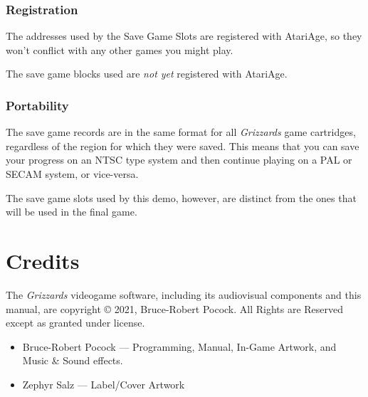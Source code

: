\documentclass[12pt,openright,book]{memoir}
\begin{document}
\begin{description}
\subsection{Registration}

\ifdefined\FIXMERegisterGameWithAtariAge

The addresses used by the Save  Game Slots are registered with AtariAge,
so they won't conflict with any other games you might play.

\else

The save game blocks used are \emph{not yet} registered with AtariAge.

\fi

\fi


\subsection{Portability}

The save game records are in the same format for all \textit{Grizzards} game
cartridges, regardless of the region for which they were saved.  This means
that you can save your progress on an NTSC type system and then continue
playing on a PAL or SECAM system, or vice-versa.

\ifdefined\DEMO

The save  game slots used by  this demo, however, are  distinct from the
ones that will be used in the final game.

\fi

\chapter{Credits}

The  \textit{Grizzards} videogame  software,  including its  audiovisual
components   and  this   manual,   are   copyright  \copyright{}   2021,
Bruce-Robert  Pocock.   All  Rights  are  Reserved   except  as  granted
under license.

\begin{itemize}
\item Bruce-Robert  Pocock --- Programming, Manual,  In-Game Artwork,
  and Music \& Sound effects.
\item Zephyr Salz --- Label/Cover Artwork
\end{itemize}

\bigskip


\end{description}
\end{document}
